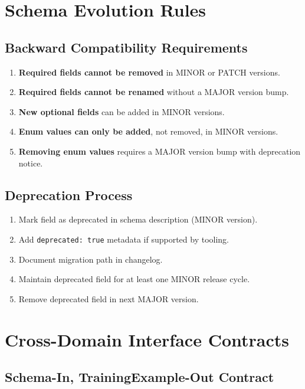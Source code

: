 \section{Schema Evolution Rules}

\subsection{Backward Compatibility Requirements}

\begin{enumerate}
  \item \textbf{Required fields cannot be removed} in MINOR or PATCH versions.
  \item \textbf{Required fields cannot be renamed} without a MAJOR version bump.
  \item \textbf{New optional fields} can be added in MINOR versions.
  \item \textbf{Enum values can only be added}, not removed, in MINOR versions.
  \item \textbf{Removing enum values} requires a MAJOR version bump with deprecation notice.
\end{enumerate}

\subsection{Deprecation Process}

\begin{enumerate}
  \item Mark field as deprecated in schema description (MINOR version).
  \item Add \texttt{deprecated: true} metadata if supported by tooling.
  \item Document migration path in changelog.
  \item Maintain deprecated field for at least one MINOR release cycle.
  \item Remove deprecated field in next MAJOR version.
\end{enumerate}

\section{Cross-Domain Interface Contracts}

\subsection{Schema-In, TrainingExample-Out Contract}

